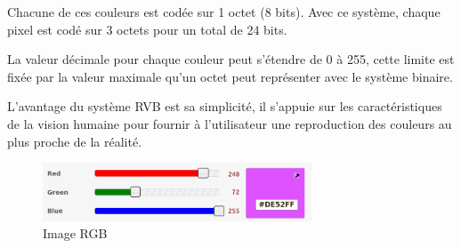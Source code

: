 \documentclass[11pt, a4paper]{book}
\begin{document}
Chacune de ces couleurs est codée sur 1 octet (8 bits). 
Avec ce système, chaque pixel est codé sur 3 octets pour un total de 24 bits. 

La valeur décimale pour chaque couleur peut s’étendre de 0 à 255, cette limite est fixée par la valeur maximale qu’un octet peut représenter avec le système binaire.

L’avantage du système RVB est sa simplicité, 
il s’appuie sur les caractéristiques de la vision humaine pour fournir à l’utilisateur une reproduction des couleurs au plus proche de la réalité.


\begin{center}
\begin{figure}[H]
\centering
\includegraphics[width=8cm]{images/RGB}
\caption{Image RGB}
\end{figure}
\end{center}
\end{document}
